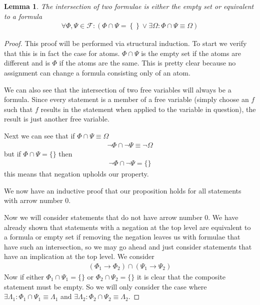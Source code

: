 \documentclass{article}
\newtheorem{lem}{Lemma}
\begin{document}
\begin{lem}
The intersection of two formulae is either the empty set or equivalent to a formula
\begin{align*}
\forall \Phi,\Psi \in \mathcal{F} : \left(\Phi \cap \Psi = \left\{\right\} \lor \exists \Omega : \Phi \cap \Psi \equiv \Omega \right)
\end{align*}
\end{lem}
\begin{proof}
This proof will be performed via structural induction.
To start we verify that this is in fact the case for atoms.
$\Phi \cap \Psi$ is the empty set if the atoms are different and is $\Phi$ if the atoms are the same.
This is pretty clear because no assignment can change a formula consisting only of an atom.

We can also see that the intersection of two free variables will always be a formula.
Since every statement is a member of a free variable (simply choose an $f$ such that $f$ results in the statement when applied to the variable in question),
the result is just another free variable.

Next we can see that if $\Phi \cap \Psi \equiv \Omega$
\begin{align*}
\neg \Phi \cap \neg \Psi \equiv \neg \Omega
\end{align*}
but if $\Phi \cap \Psi = \{\}$ then
\begin{align*}
\neg \Phi \cap \neg \Psi = \{\}
\end{align*}
this means that negation upholds our property.

We now have an inductive proof that our proposition holds for all statements with arrow number $0$.

Now we will consider statements that do not have arrow number $0$.
We have already shown that statements with a negation at the top level are equivalent to a formula or empty set if removing the negation leaves us with formulae that have such an intersection, so we may go ahead and just consider statements that have an implication at the top level.
We consider
\begin{align*}
(\Phi_1 \rightarrow \Phi_2) \cap (\Psi_1 \rightarrow \Psi_2)
\end{align*}
Now if either $\Phi_1 \cap \Psi_1 = \{\}$ or $\Phi_2 \cap \Psi_2 = \{\}$ it is clear that the composite statement must be empty.
So we will only consider the case where $\exists \Lambda_1 : \Phi_1 \cap \Psi_1 \equiv \Lambda_1$ and $\exists \Lambda_2 : \Phi_2 \cap \Psi_2 \equiv \Lambda_2$.


\end{proof}
\end{document}
